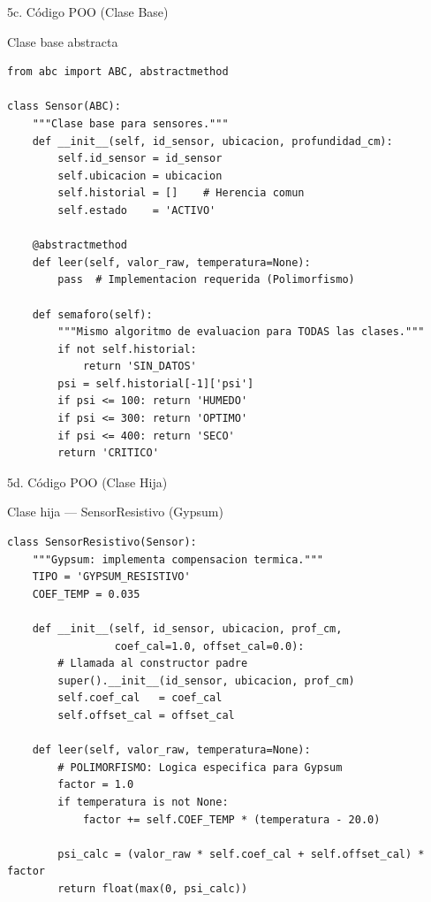 \documentclass[11pt, aspectratio=169]{beamer}
\begin{document}
\begin{frame}[fragile]{5c. Código POO (Clase Base)}
\begin{exampleblock}{Clase base abstracta}
\begin{lstlisting}[numbers=none,frame=none,basicstyle=\ttfamily\small]
from abc import ABC, abstractmethod

class Sensor(ABC):
    """Clase base para sensores."""
    def __init__(self, id_sensor, ubicacion, profundidad_cm):
        self.id_sensor = id_sensor
        self.ubicacion = ubicacion
        self.historial = []    # Herencia comun
        self.estado    = 'ACTIVO'

    @abstractmethod
    def leer(self, valor_raw, temperatura=None):
        pass  # Implementacion requerida (Polimorfismo)

    def semaforo(self):
        """Mismo algoritmo de evaluacion para TODAS las clases."""
        if not self.historial:
            return 'SIN_DATOS'
        psi = self.historial[-1]['psi']
        if psi <= 100: return 'HUMEDO'
        if psi <= 300: return 'OPTIMO'
        if psi <= 400: return 'SECO'
        return 'CRITICO'
\end{lstlisting}
\end{exampleblock}
\end{frame}

\begin{frame}[fragile]{5d. Código POO (Clase Hija)}
\begin{block}{Clase hija --- SensorResistivo (Gypsum)}
\begin{lstlisting}[numbers=none,frame=none,basicstyle=\ttfamily\small]
class SensorResistivo(Sensor):
    """Gypsum: implementa compensacion termica."""
    TIPO = 'GYPSUM_RESISTIVO'
    COEF_TEMP = 0.035

    def __init__(self, id_sensor, ubicacion, prof_cm,
                 coef_cal=1.0, offset_cal=0.0):
        # Llamada al constructor padre
        super().__init__(id_sensor, ubicacion, prof_cm)
        self.coef_cal   = coef_cal
        self.offset_cal = offset_cal

    def leer(self, valor_raw, temperatura=None):
        # POLIMORFISMO: Logica especifica para Gypsum
        factor = 1.0
        if temperatura is not None:
            factor += self.COEF_TEMP * (temperatura - 20.0)
            
        psi_calc = (valor_raw * self.coef_cal + self.offset_cal) * factor
        return float(max(0, psi_calc))
\end{lstlisting}
\end{block}
\end{frame}
\end{document}
